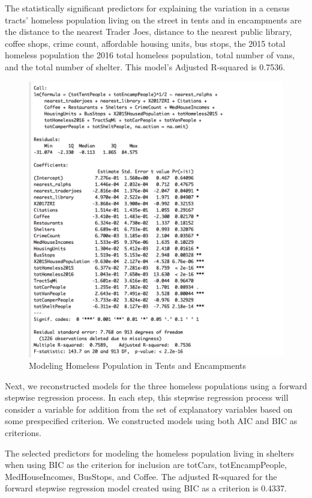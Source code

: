 \documentclass[11pt,letterpaper]{article}
\begin{document}
The statistically significant predictors for explaining the variation in a census tracts’ homeless population living on the street in tents and in encampments are the distance to the nearest Trader Joes, distance to the nearest public library, coffee shops, crime count, affordable housing units, bus stops, the 2015 total homeless population the 2016 total homeless population, total number of vans, and the total number of shelter. This model’s Adjusted R-squared is 0.7536.

\begin{figure}[H]
\centering
\caption{Modeling Homeless Population in Tents and Encampments}
\includegraphics[scale=0.75]{predictingStreetHomeless.png}
\end{figure}

Next, we reconstructed models for the three homeless populations using a forward stepwise regression process. In each step, this stepwise regression process will consider a variable for addition from the set of explanatory variables based on some prespecified criterion. We constructed models using both AIC and BIC as criterions.

The selected predictors for modeling the homeless population living in shelters when using BIC as the criterion for inclusion are  totCars, totEncampPeople, MedHouseIncomes, BusStops, and Coffee. The adjusted R-squared for the forward stepwise regression model created using BIC as a criterion is 0.4337.
 
\end{document}
